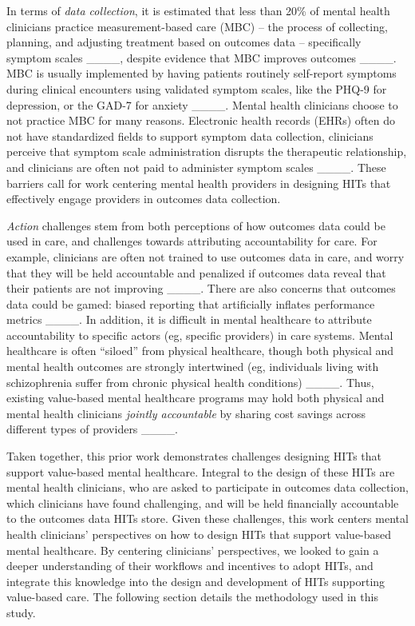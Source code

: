 In terms of \textit{data collection}, it is estimated that less than 20\% of mental health clinicians practice measurement-based care (MBC) -- the process of collecting, planning, and adjusting treatment based on outcomes data -- specifically symptom scales ____, despite evidence that MBC improves outcomes ____. 
MBC is usually implemented by having patients routinely self-report symptoms during clinical encounters using validated symptom scales, like the PHQ-9 for depression, or the GAD-7 for anxiety ____.
Mental health clinicians choose to not practice MBC for many reasons. 
Electronic health records (EHRs) often do not have standardized fields to support symptom data collection, clinicians perceive that symptom scale administration disrupts the therapeutic relationship, and clinicians are often not paid to administer symptom scales ____.
These barriers call for work centering mental health providers in designing HITs that effectively engage providers in outcomes data collection.

\textit{Action} challenges stem from both perceptions of how outcomes data could be used in care, and challenges towards attributing accountability for care.
For example, clinicians are often not trained to use outcomes data in care, and worry that they will be held accountable and penalized if outcomes data reveal that their patients are not improving ____.
There are also concerns that outcomes data could be gamed: biased reporting that artificially inflates performance metrics ____.
In addition, it is difficult in mental healthcare to attribute accountability to specific actors (eg, specific providers) in care systems.
Mental healthcare is often ``siloed'' from physical healthcare, though both physical and mental health outcomes are strongly intertwined (eg, individuals living with schizophrenia suffer from chronic physical health conditions) ____.
Thus, existing value-based mental healthcare programs may hold both physical and mental health clinicians \textit{jointly accountable} by sharing cost savings across different types of providers ____.

Taken together, this prior work demonstrates challenges designing HITs that support value-based mental healthcare.
Integral to the design of these HITs are mental health clinicians, who are asked to participate in outcomes data collection, which clinicians have found challenging, and will be held financially accountable to the outcomes data HITs store.
Given these challenges, this work centers mental health clinicians' perspectives on how to design HITs that support value-based mental healthcare.
By centering clinicians' perspectives, we looked to gain a deeper understanding of their workflows and incentives to adopt HITs, and integrate this knowledge into the design and development of HITs supporting value-based care. 
The following section details the methodology used in this study.
